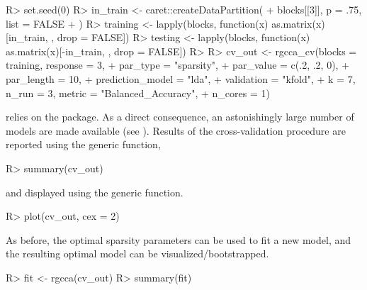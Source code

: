 \documentclass[
]{jss}
\begin{document}
\footnotesize

\begin{CodeChunk}
\begin{CodeInput}
R> set.seed(0) 
R> in_train <- caret::createDataPartition(
+   blocks[[3]], p = .75, list = FALSE
+ )
R> training <- lapply(blocks, function(x) as.matrix(x)[in_train, , drop = FALSE])
R> testing <- lapply(blocks, function(x) as.matrix(x)[-in_train, , drop = FALSE])
R> 
R> cv_out <- rgcca_cv(blocks = training, response = 3,
+                    par_type = "sparsity",
+                    par_value = c(.2, .2, 0),
+                    par_length = 10,
+                    prediction_model = "lda",
+                    validation = "kfold",
+                    k = 7, n_run = 3, metric = "Balanced_Accuracy",
+                    n_cores = 1)
\end{CodeInput}
\end{CodeChunk}

\normalsize

 relies on the  package. As a direct
consequence, an astonishingly large number of models are made available
(see ). Results of the cross-validation
procedure are reported using the generic  function,

\footnotesize

\begin{CodeChunk}
\begin{CodeInput}
R> summary(cv_out)
\end{CodeInput}
\end{CodeChunk}

\normalsize

and displayed using the generic  function.

\footnotesize

\begin{CodeChunk}
\begin{CodeInput}
R> plot(cv_out, cex = 2)
\end{CodeInput}
\end{CodeChunk}

\normalsize

As before, the optimal sparsity parameters can be used to fit a new
model, and the resulting optimal model can be visualized/bootstrapped.

\footnotesize

\begin{CodeChunk}
\begin{CodeInput}
R> fit <- rgcca(cv_out)
R> summary(fit)
\end{CodeInput}
\end{CodeChunk}
\end{document}
